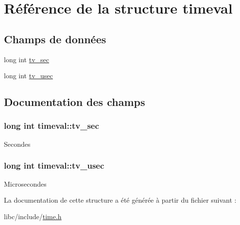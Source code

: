 \hypertarget{structtimeval}{\section{Référence de la structure timeval}
\label{structtimeval}
}
\subsection*{Champs de données}
\begin{DoxyCompactItemize}
\item 
long int \hyperlink{structtimeval_ab6fac84a084d017bb157f4681dafe8a3}{tv\-\_\-sec}
\item 
long int \hyperlink{structtimeval_a6f90a236deb00a89fe3dd8023d525d9c}{tv\-\_\-usec}
\end{DoxyCompactItemize}


\subsection{Documentation des champs}
\hypertarget{structtimeval_ab6fac84a084d017bb157f4681dafe8a3}{
\subsubsection[{tv\-\_\-sec}]{\setlength{\rightskip}{0pt plus 5cm}long int timeval\-::tv\-\_\-sec}}\label{structtimeval_ab6fac84a084d017bb157f4681dafe8a3}
Secondes \hypertarget{structtimeval_a6f90a236deb00a89fe3dd8023d525d9c}{
\subsubsection[{tv\-\_\-usec}]{\setlength{\rightskip}{0pt plus 5cm}long int timeval\-::tv\-\_\-usec}}\label{structtimeval_a6f90a236deb00a89fe3dd8023d525d9c}
Microsecondes 

La documentation de cette structure a été générée à partir du fichier suivant \-:\begin{DoxyCompactItemize}
\item 
libc/include/\hyperlink{time_8h}{time.\-h}\end{DoxyCompactItemize}
